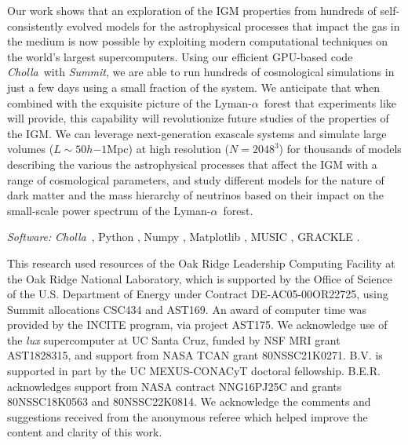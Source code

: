 \documentclass[twocolumn]{aastex62}
\newcommand\Cholla{\emph{Cholla}~}
\newcommand\Lya{Lyman-$\alpha$}
\begin{document}
Our work shows that an exploration of the IGM properties from hundreds of self-consistently evolved models for the astrophysical processes
that impact the gas in the medium is now possible by exploiting modern computational techniques on the world's largest supercomputers.
Using our efficient GPU-based code \Cholla with {\it Summit},
we are able to run hundreds of cosmological simulations in just a few days using a small fraction of the system.
We anticipate that when combined 
with the exquisite picture of the \Lya\ forest that experiments like \cite{desi2016a} will provide,
this capability will revolutionize future studies of the properties of the 
IGM.
We can leverage next-generation exascale systems and simulate large volumes ($L\sim 50h{-1}$Mpc) at high resolution ($N=2048^3$) 
for thousands of models describing the various the astrophysical processes that affect the IGM with
 a range of cosmological parameters, and study 
different models for the nature of dark matter and the mass hierarchy of neutrinos
based on their impact on the small-scale power spectrum of the \Lya\ forest.     


\smallskip
\smallskip

\textit{Software:} \Cholla \citep[\url{https://github.com/cholla-hydro/cholla}]{schneider2015a}, Python \citep{Python}, Numpy \citep{numpy}, 
Matplotlib \citep{matplotlib}, MUSIC \citep{Hahn+2011_Music}, GRACKLE \citep{smith2017a}.
 

\acknowledgements
This research used resources of the Oak Ridge Leadership Computing Facility at the Oak Ridge National Laboratory, which is supported by 
the Office of Science of the U.S. Department of Energy under Contract DE-AC05-00OR22725, using Summit allocations CSC434 and 
AST169.  An award of computer time was provided by the INCITE program, via project AST175. We acknowledge use of the {\it lux} supercomputer at UC Santa Cruz, funded by NSF MRI grant AST1828315, and support from 
NASA TCAN grant 80NSSC21K0271. B.V. is supported in part by the UC MEXUS-CONACyT doctoral fellowship. B.E.R. acknowledges 
support from NASA contract NNG16PJ25C and grants 80NSSC18K0563 and 80NSSC22K0814.  We acknowledge the comments
and suggestions received from the anonymous referee which helped improve the content and clarity of this
work.

\appendix
\end{document}
